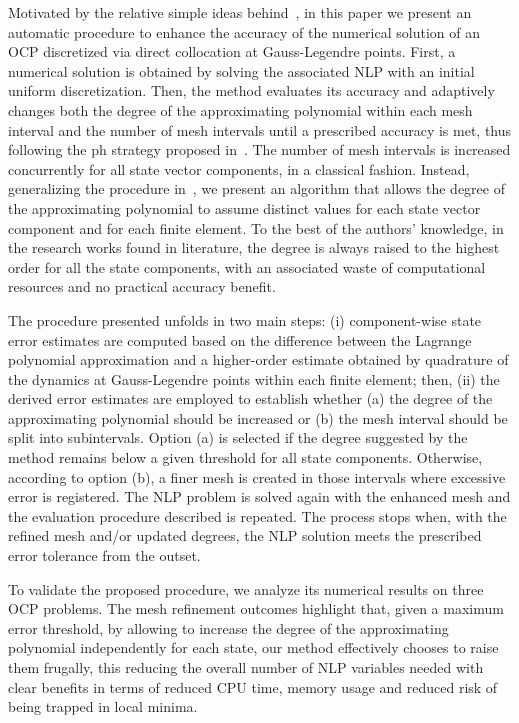 Motivated by the relative simple ideas behind~\cite{Patterson:OCAM:2015}, in this paper we present an automatic procedure to enhance the accuracy of the numerical solution of an OCP discretized via direct collocation at Gauss-Legendre points. First, a numerical solution is obtained by solving the associated NLP with an initial uniform discretization. Then, the method evaluates its accuracy and adaptively changes both the degree of the approximating polynomial within each mesh interval and the number of mesh intervals until a prescribed accuracy is met, thus following the ph strategy proposed in~\cite{Patterson:OCAM:2015}.
The number of mesh intervals is increased concurrently for all state vector components, in a classical fashion. Instead, generalizing the procedure in~\cite{Patterson:OCAM:2015}, we present an algorithm that allows the degree of the approximating polynomial to assume distinct values for each state vector component and for each finite element. To the best of the authors' knowledge, in the research works found in literature, the degree is always raised to the highest order for all the state components, with an associated waste of computational resources and no practical accuracy benefit.
		
The procedure presented unfolds in two main steps: (i) component-wise state error estimates are computed based on the difference between the Lagrange polynomial approximation and a higher-order estimate obtained by quadrature of the dynamics at Gauss-Legendre points within each finite element; then, (ii) the derived error estimates are employed to establish whether (a) the degree of the approximating polynomial should be increased or (b) the mesh interval should be split into subintervals. Option (a) is selected if the degree suggested by the method remains below a given threshold for all state components. Otherwise, according to option (b), a finer mesh is created in those intervals where excessive error is registered.
The NLP problem is solved again with the enhanced mesh and the evaluation procedure described is repeated. The process stops when, with the refined mesh and/or updated degrees, the NLP solution meets the prescribed error tolerance from the outset.

To validate the proposed procedure, we analyze its numerical results on three OCP problems. The mesh refinement outcomes highlight that, given a maximum error threshold, by allowing to increase the degree of the approximating polynomial independently for each state, our method effectively chooses to raise them frugally, this reducing the overall number of NLP variables needed with clear benefits in terms of reduced CPU time, memory usage and reduced risk of being trapped in local minima.

